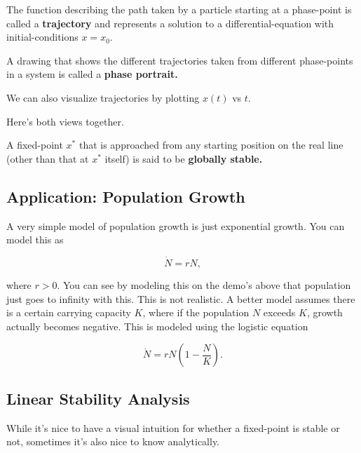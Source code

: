 \documentclass{article}
\begin{document}
\begin{definition}[Trajectory]
The function describing the path taken by a particle starting at a \@{phase-point} is called a \textbf{trajectory} and represents a solution to a \@{differential-equation} with \@{initial-conditions} $x = x_0.$
\end{definition}

\begin{definition}
A drawing that shows the different \@{trajectories} taken from different \@{phase-points} in a system is called a \textbf{phase portrait.}
\end{definition}

We can also visualize \@{trajectories} by plotting $x(t)$ vs $t.$


Here's both views together.


\begin{definition}
A \@{fixed-point} $x^*$ that is approached from any starting position on the real line (other than that at $x^*$ itself) is said to be \textbf{globally stable.}
\end{definition}

\subsection{Application: Population Growth}

A very simple model of population growth is just exponential growth. You can model this as

\[ \dot{N} = r{N}, \]

where $r > 0.$ You can see by modeling this on the demo's above that population just goes to infinity with this. This is not realistic. A better model assumes there is a certain carrying capacity $K$, where if the population $N$ exceeds $K$, growth actually becomes negative. This is modeled using the logistic equation

\[ \dot{N} = rN(1 - \frac{N}{K}). \]

\subsection{Linear Stability Analysis}

While it's nice to have a visual intuition for whether a \@{fixed-point} is \@{stable} or not, sometimes it's also nice to know analytically.
\end{document}
